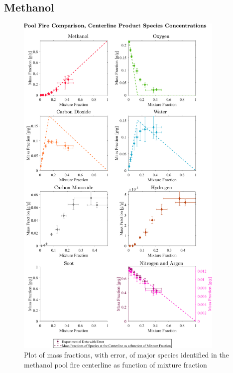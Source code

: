 \documentclass[12pt]{article}
\begin{document}
\subsection{Methanol}
\label{ssec:Methanol_ALL_Mix_Frac}

\begin{figure}[!h]
	\centering
\includegraphics[width=10.0cm,keepaspectratio]{Methanol_Mixture_Fraction_Major_Plot.png}
	\caption[Plot of mass fractions, with error, of major species identified in the methanol pool fire centerline as function of mixture fraction]{Plot of mass fractions, with error, of major species identified in the methanol pool fire centerline as function of mixture fraction}
	\label{fig:Methanol_MIX_Frac_Major}
\end{figure}

\pagebreak
\end{document}
